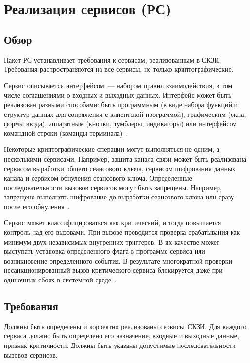\section{Реализация сервисов (РС)}\label{SV}

\subsection{Обзор}\label{SV.Intro}

Пакет РС устанавливает требования к сервисам, реализованным в СКЗИ.
%
Требования распространяются на все сервисы, не только криптографические.

Сервис описывается интерфейсом~--- набором правил взаимодействия,
в том числе соглашениями о входных и выходных данных.
%
Интерфейс может быть реализован разными способами:
%
быть программным (в виде набора функций и структур данных для сопряжения
с клиентской программой), графическим (окна, формы ввода),
аппаратным (кнопки, тумблеры, индикаторы)
или интерфейсом командной строки (команды терминала)~.

Некоторые криптографические операции могут выполняться не одним, а несколькими 
сервисами.  Например, защита канала связи может быть реализована сервисом 
выработки общего сеансового ключа, сервисом шифрования данных канала
и сервисом обнуления сеансового ключа.
%
Определенные последовательности вызовов сервисов могут быть 
запрещены. Например, запрещено выполнять шифрование до 
выработки сеансового ключа или сразу после его обнуления~.

Сервис может классифицироваться как критический, и тогда повышается
контроль над его вызовами. 
%
При вызове проводится проверка срабатывания как минимум двух 
независимых внутренних триггеров. В их качестве может выступать установка 
определенного флага в программе сервиса или возникновение определенного 
события.
%
В результате многократной проверки несанкционированный вызов критического
сервиса блокируется даже при одиночных сбоях в системной 
среде~.

\subsection{Требования}\label{SV.Reqs}

\label{R.SV.List}
Должны быть определены и корректно реализованы сервисы~СКЗИ.
%
Для каждого сервиса должно быть определено его назначение, 
входные и выходные данные, признак критичности.
%
Должны быть указаны допустимые последовательности вызовов сервисов.

